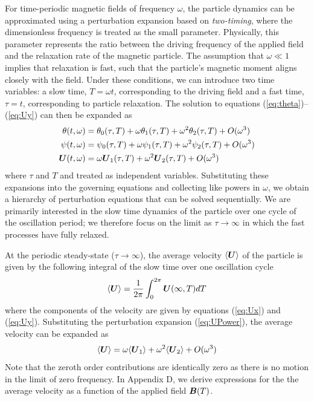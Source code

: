 For time-periodic magnetic fields of frequency $\omega$, the particle dynamics can be approximated using a perturbation expansion based on \emph{two-timing},\autocite{Strogatz2015} where the dimensionless frequency is treated as the small parameter. Physically, this parameter represents the ratio between the driving frequency of the applied field and the relaxation rate of the magnetic particle. The assumption that $\omega\ll 1$ implies that relaxation is fast, such that the particle's magnetic moment aligns closely with the field. Under these conditions, we can introduce two time variables: a slow time, $T=\omega t$, corresponding to the driving field and a fast time, $\tau=t$, corresponding to particle relaxation. The solution to equations (\ref{eq:theta})--(\ref{eq:Uy}) can then be expanded as
\begin{align}
    \theta(t,\omega) &= \theta_0(\tau,T) + \omega \theta_1(\tau,T) + \omega^2 \theta_2(\tau,T) + O(\omega^3) \label{eq:thetaPower}
    \\
    \psi(t,\omega) &= \psi_0(\tau,T) + \omega \psi_1(\tau,T) + \omega^2 \psi_2(\tau,T) + O(\omega^3) \label{eq:psiPower}
    \\
    \boldsymbol{U}(t,\omega) &= \omega \boldsymbol{U}_1(\tau,T) + \omega^2 \boldsymbol{U}_2(\tau,T) + O(\omega^3) \label{eq:UPower}
\end{align}
where $\tau$ and $T$ and treated as independent variables. Substituting these expansions into the governing equations and collecting like powers in $\omega$, we obtain a hierarchy of perturbation equations that can be solved sequentially. We are primarily interested in the slow time dynamics of the particle over one cycle of the oscillation period; we therefore focus on the limit as $\tau\rightarrow\infty$ in which the fast processes have fully relaxed.

At the periodic steady-state ($\tau\rightarrow\infty$), the average velocity $\langle\boldsymbol{U}\rangle$ of the particle is given by the following integral of the slow time over one oscillation cycle
\begin{equation}
    \langle\boldsymbol{U}\rangle = \frac{1}{2\pi} \int_0^{2\pi} \boldsymbol{U}(\infty, T) dT
\end{equation}
where the components of the velocity are given by equations (\ref{eq:Ux}) and (\ref{eq:Uy}).  Substituting the perturbation expansion (\ref{eq:UPower}), the average velocity can be expanded as
\begin{equation}
    \langle\boldsymbol{U}\rangle = \omega \langle\boldsymbol{U}_1\rangle + \omega^2 \langle\boldsymbol{U}_2\rangle + O(\omega^3) \label{eq:averageU}
\end{equation}
Note that the zeroth order contributions are identically zero as there is no motion in the limit of zero frequency. In Appendix D, we derive expressions for the the average velocity as a function of the applied field $\boldsymbol{B}(T)$.

